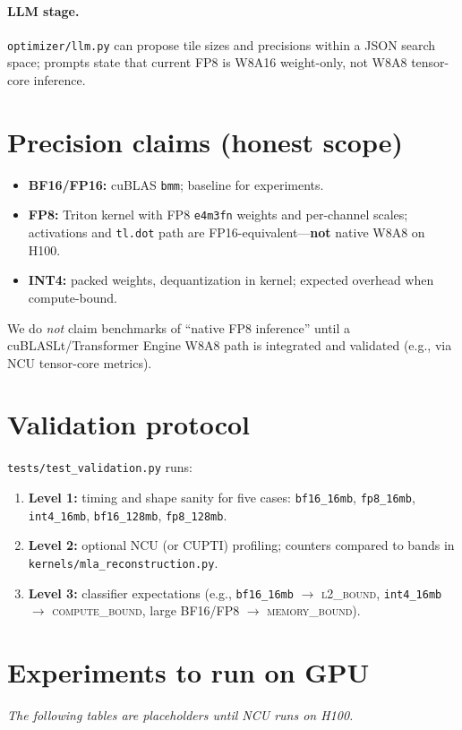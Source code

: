 \documentclass[11pt]{article}
\begin{document}
\paragraph{LLM stage.}
\texttt{optimizer/llm.py} can propose tile sizes and precisions within a JSON search space; prompts state that current FP8 is W8A16 weight-only, not W8A8 tensor-core inference.

\section{Precision claims (honest scope)}
\begin{itemize}\itemsep0pt
  \item \textbf{BF16/FP16:} cuBLAS \texttt{bmm}; baseline for experiments.
  \item \textbf{FP8:} Triton kernel with FP8 \texttt{e4m3fn} weights and per-channel scales; activations and \texttt{tl.dot} path are FP16-equivalent---\textbf{not} native W8A8 on H100.
  \item \textbf{INT4:} packed weights, dequantization in kernel; expected overhead when compute-bound.
\end{itemize}
We do \emph{not} claim benchmarks of ``native FP8 inference'' until a cuBLASLt/Transformer Engine W8A8 path is integrated and validated (e.g., via NCU tensor-core metrics).

\section{Validation protocol}
\label{sec:validation}
\texttt{tests/test\_validation.py} runs:
\begin{enumerate}\itemsep0pt
  \item \textbf{Level 1:} timing and shape sanity for five cases: \texttt{bf16\_16mb}, \texttt{fp8\_16mb}, \texttt{int4\_16mb}, \texttt{bf16\_128mb}, \texttt{fp8\_128mb}.
  \item \textbf{Level 2:} optional NCU (or CUPTI) profiling; counters compared to bands in \texttt{kernels/mla\_reconstruction.py}.
  \item \textbf{Level 3:} classifier expectations (e.g., \texttt{bf16\_16mb} $\rightarrow$ \textsc{l2\_bound}, \texttt{int4\_16mb} $\rightarrow$ \textsc{compute\_bound}, large BF16/FP8 $\rightarrow$ \textsc{memory\_bound}).
\end{enumerate}

\section{Experiments to run on GPU}
\label{sec:data}
\textit{The following tables are placeholders until NCU runs on H100.}
\end{document}
